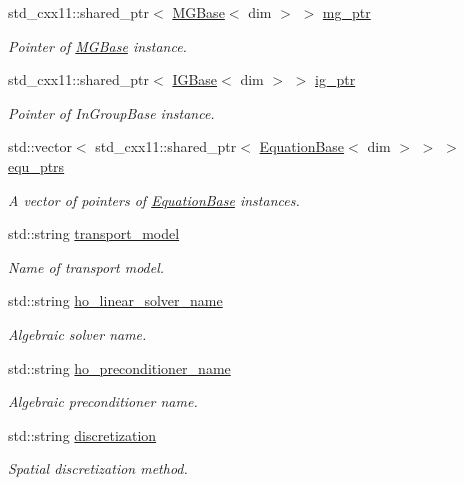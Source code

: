 \begin{DoxyCompactItemize}
std\+\_\+cxx11\+::shared\+\_\+ptr$<$ \hyperlink{class_m_g_base}{M\+G\+Base}$<$ dim $>$ $>$ \hyperlink{class_bart_driver_a1ae1a91d9a049ba4354c71f6ad689d74}{mg\+\_\+ptr}
\begin{DoxyCompactList}\small\item\em Pointer of \hyperlink{class_m_g_base}{M\+G\+Base} instance. \end{DoxyCompactList}\item 
std\+\_\+cxx11\+::shared\+\_\+ptr$<$ \hyperlink{class_i_g_base}{I\+G\+Base}$<$ dim $>$ $>$ \hyperlink{class_bart_driver_a83323d9561c906f6094a51a5c936cea4}{ig\+\_\+ptr}
\begin{DoxyCompactList}\small\item\em Pointer of In\+Group\+Base instance. \end{DoxyCompactList}\item 
std\+::vector$<$ std\+\_\+cxx11\+::shared\+\_\+ptr$<$ \hyperlink{class_equation_base}{Equation\+Base}$<$ dim $>$ $>$ $>$ \hyperlink{class_bart_driver_a0a6f52aed8e9c22da12a99653d1acba8}{equ\+\_\+ptrs}
\begin{DoxyCompactList}\small\item\em A vector of pointers of \hyperlink{class_equation_base}{Equation\+Base} instances. \end{DoxyCompactList}\item 
std\+::string \hyperlink{class_bart_driver_a736f40f99459dc715fdb174e06626f55}{transport\+\_\+model}
\begin{DoxyCompactList}\small\item\em Name of transport model. \end{DoxyCompactList}\item 
std\+::string \hyperlink{class_bart_driver_a7dcefb31d64ad2e76d4c04a44cb26f7c}{ho\+\_\+linear\+\_\+solver\+\_\+name}
\begin{DoxyCompactList}\small\item\em Algebraic solver name. \end{DoxyCompactList}\item 
std\+::string \hyperlink{class_bart_driver_a0662a7c4208dc352aec9adf789edb463}{ho\+\_\+preconditioner\+\_\+name}
\begin{DoxyCompactList}\small\item\em Algebraic preconditioner name. \end{DoxyCompactList}\item 
std\+::string \hyperlink{class_bart_driver_a75cc884c6895beca3d3861ca226b4a3f}{discretization}
\begin{DoxyCompactList}\small\item\em Spatial discretization method. \end{DoxyCompactList}\item 

\end{DoxyCompactItemize}
